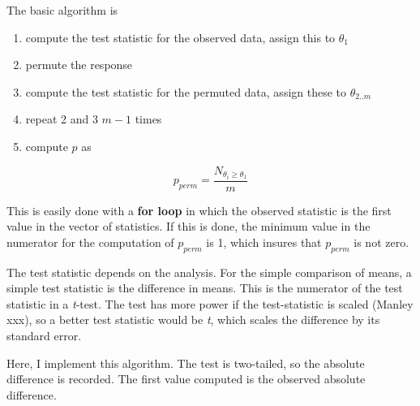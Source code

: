 \documentclass[]{book}
\providecommand{\tightlist}{%
  \setlength{\itemsep}{0pt}\setlength{\parskip}{0pt}}
\begin{document}
The basic algorithm is

\begin{enumerate}
\def\labelenumi{\arabic{enumi}.}
\tightlist
\item
  compute the test statistic for the observed data, assign this to \(\theta_1\)
\item
  permute the response
\item
  compute the test statistic for the permuted data, assign these to \(\theta_{2..m}\)
\item
  repeat 2 and 3 \(m-1\) times
\item
  compute \(p\) as
\end{enumerate}

\begin{equation}
p_{perm} = \frac{N_{\theta_i \ge \theta_{1}}}{m}
\end{equation}

This is easily done with a \textbf{for loop} in which the observed statistic is the first value in the vector of statistics. If this is done, the minimum value in the numerator for the computation of \(p_{perm}\) is 1, which insures that \(p_{perm}\) is not zero.

The test statistic depends on the analysis. For the simple comparison of means, a simple test statistic is the difference in means. This is the numerator of the test statistic in a \emph{t}-test. The test has more power if the test-statistic is scaled (Manley xxx), so a better test statistic would be \emph{t}, which scales the difference by its standard error.

Here, I implement this algorithm. The test is two-tailed, so the absolute difference is recorded. The first value computed is the observed absolute difference.
\end{document}
